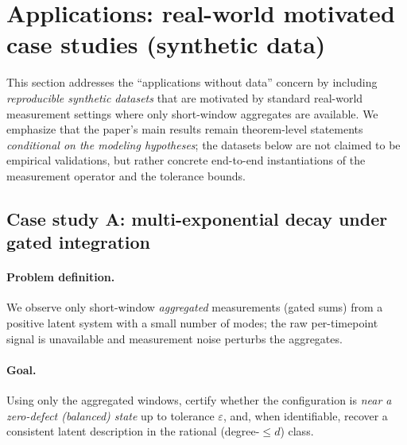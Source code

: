 \documentclass[11pt,reqno]{amsart}
\theoremstyle{definition}
\theoremstyle{remark}
\newcommand{\1}{\mathbf{1}}
\begin{document}
\section{Applications: real-world motivated case studies (synthetic data)}\label{sec:applications}

This section addresses the ``applications without data'' concern by including \emph{reproducible synthetic datasets} that are motivated by standard real-world measurement settings where only short-window aggregates are available.
We emphasize that the paper's main results remain theorem-level statements \emph{conditional on the modeling hypotheses};
the datasets below are not claimed to be empirical validations, but rather concrete end-to-end instantiations of the measurement operator and the tolerance bounds.

\subsection{Case study A: multi-exponential decay under gated integration}

\paragraph{Problem definition.}
We observe only short-window \emph{aggregated} measurements (gated sums) from a positive latent system with a small number of modes; the raw per-timepoint signal is unavailable and measurement noise perturbs the aggregates.

\paragraph{Goal.}
Using only the aggregated windows, certify whether the configuration is \emph{near a zero-defect (balanced) state} up to tolerance $\varepsilon$, and, when identifiable, recover a consistent latent description in the rational (degree-$\le d$) class.
\end{document}
